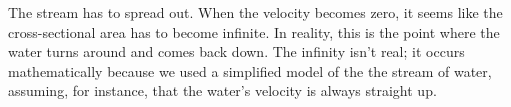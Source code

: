 The stream has to spread out. When the velocity becomes zero, it
seems like the cross-sectional area has to become infinite. In
reality, this is the point where the water turns around and comes
back down. The infinity isn't real; it occurs mathematically because
we used a simplified model of the the stream of water, assuming, for
instance, that the water's velocity is always straight up.
